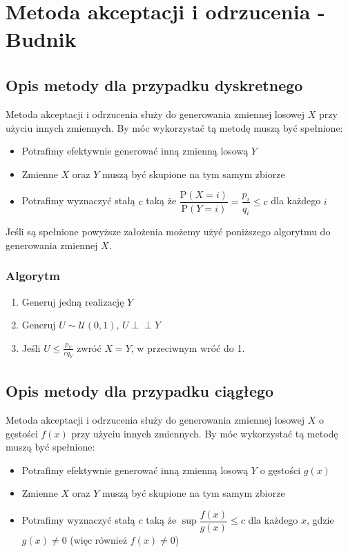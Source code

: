 \documentclass[12pt]{mwrep}
\newcommand{\indep}{\perp \!\!\! \perp}
\begin{document}

	
	\section{Metoda akceptacji i odrzucenia\textsuperscript{\cite{AO - dyskretny}} - Budnik}
	\subsection{Opis metody dla przypadku dyskretnego\textsuperscript{\cite{AO - dyskretny}}}
	\noindent Metoda akceptacji i odrzucenia służy do generowania zmiennej losowej $X$ przy użyciu innych zmiennych. By móc wykorzystać tą metodę muszą być spełnione:
	\begin{itemize}[leftmargin=10mm]
		\item Potrafimy efektywnie generować inną zmienną losową $Y$
		\item Zmienne $X$ oraz $Y$ muszą być skupione na tym samym zbiorze
		\item Potrafimy wyznaczyć stałą $c$ taką że $\dfrac{\mathrm{P}(X=i)}{\mathrm{P}(Y=i)}=\dfrac{p_i}{q_i}\leqslant c$ dla każdego $i$
	\end{itemize}
	Jeśli są spełnione powyższe założenia możemy użyć poniższego algorytmu do generowania zmiennej $X$.
	\subsubsection{Algorytm}
	\begin{enumerate}[leftmargin=10mm]
		\item Generuj jedną realizację $Y$
		\item Generuj $U\sim \mathcal{U}(0,1)$, $U\indep Y$
		\item Jeśli $U\leqslant\frac{p_Y}{cq_Y}$ zwróć $X=Y$, w przeciwnym wróć do 1.
	\end{enumerate}
	
	
	\subsection{Opis metody dla przypadku ciągłego\textsuperscript{\cite{AO - ciagly}}}
	M\noindent etoda akceptacji i odrzucenia służy do generowania zmiennej losowej $X$ o gęstości $f(x)$ przy użyciu innych zmiennych. By móc wykorzystać tą metodę muszą być spełnione:
	\begin{itemize}[leftmargin=10mm]
		\item Potrafimy efektywnie generować inną zmienną losową $Y$ o gęstości $g(x)$
		\item Zmienne $X$ oraz $Y$ muszą być skupione na tym samym zbiorze
		\item Potrafimy wyznaczyć stałą $c$ taką że $\sup\dfrac{f(x)}{g(x)}\leqslant c$ dla każdego $x$, gdzie $g(x)\neq0$ (więc również $f(x)\neq0$)
	\end{itemize}
\end{document}
